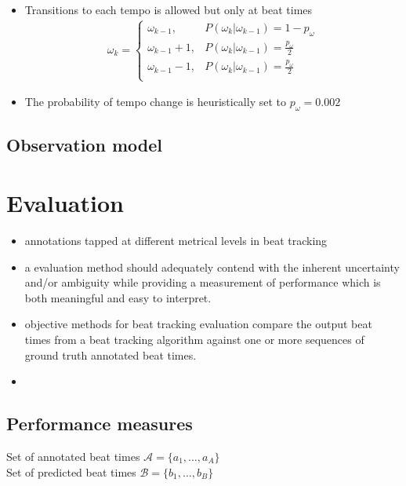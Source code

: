 \documentclass{article}
\begin{document}
\begin{itemize}
\item Transitions to each tempo is allowed but only at beat times
\begin{align}
\omega_k = 
\begin{cases}
\omega_{k-1}, & P(\omega_k|\omega_{k-1}) = 1 - p_\omega \\
\omega_{k-1}+1, & P(\omega_k|\omega_{k-1}) = \frac{p_\omega}{2} \\
\omega_{k-1}-1, & P(\omega_k|\omega_{k-1}) = \frac{p_\omega}{2} \\
\end{cases}
\end{align} 
\item The probability of tempo change is heuristically set to $p_\omega = 0.002$
\end{itemize}


\subsection{Observation model}


\section{Evaluation}


\begin{itemize}
\item annotations tapped at different metrical levels in beat tracking
\item a evaluation method should adequately contend with the inherent uncertainty and/or ambiguity while providing a measurement of performance which is both meaningful and easy to interpret. \cite{Davies2009b}
\item objective methods for beat tracking evaluation compare the output beat times from a beat tracking algorithm against one or more sequences of ground truth annotated beat times. \cite{Davies2009b}
\item 
\end{itemize}


\subsection{Performance measures}

Set of annotated beat times $\mathcal A = \{a_1, \dots, a_A\}$ \\
Set of predicted beat times $\mathcal B = \{b_1, \dots, b_B\}$ \\
\end{document}
